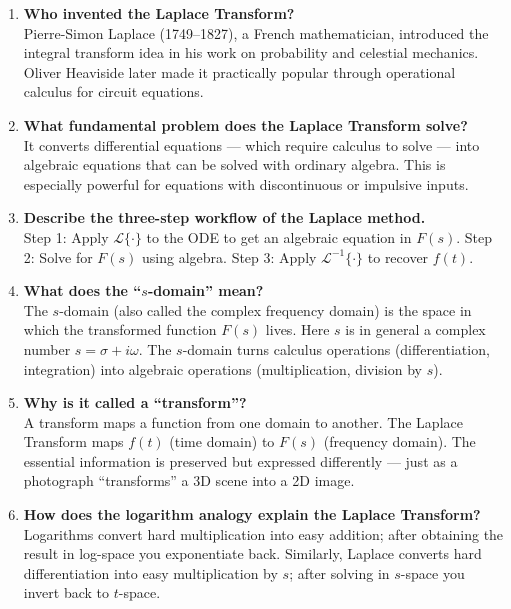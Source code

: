 \documentclass[12pt,a4paper]{article}
\begin{document}
\begin{enumerate}[label=\textbf{Q\arabic*.}, leftmargin=*, itemsep=6pt]

  \item \textbf{Who invented the Laplace Transform?} \\
        Pierre-Simon Laplace (1749--1827), a French mathematician, introduced
        the integral transform idea in his work on probability and celestial
        mechanics.  Oliver Heaviside later made it practically popular through
        operational calculus for circuit equations.

  \item \textbf{What fundamental problem does the Laplace Transform solve?} \\
        It converts differential equations --- which require calculus to
        solve --- into algebraic equations that can be solved with ordinary
        algebra.  This is especially powerful for equations with
        discontinuous or impulsive inputs.

  \item \textbf{Describe the three-step workflow of the Laplace method.} \\
        Step 1: Apply $\mathcal{L}\{\cdot\}$ to the ODE to get an algebraic
        equation in $F(s)$.
        Step 2: Solve for $F(s)$ using algebra.
        Step 3: Apply $\mathcal{L}^{-1}\{\cdot\}$ to recover $f(t)$.

  \item \textbf{What does the ``$s$-domain'' mean?} \\
        The $s$-domain (also called the complex frequency domain) is the space
        in which the transformed function $F(s)$ lives.  Here $s$ is in
        general a complex number $s = \sigma + i\omega$.  The $s$-domain
        turns calculus operations (differentiation, integration) into
        algebraic operations (multiplication, division by $s$).

  \item \textbf{Why is it called a ``transform''?} \\
        A transform maps a function from one domain to another.  The Laplace
        Transform maps $f(t)$ (time domain) to $F(s)$ (frequency domain).
        The essential information is preserved but expressed differently ---
        just as a photograph ``transforms'' a 3D scene into a 2D image.

  \item \textbf{How does the logarithm analogy explain the Laplace Transform?} \\
        Logarithms convert hard multiplication into easy addition; after
        obtaining the result in log-space you exponentiate back.
        Similarly, Laplace converts hard differentiation into easy
        multiplication by $s$; after solving in $s$-space you invert
        back to $t$-space.


\end{enumerate}
\end{document}
